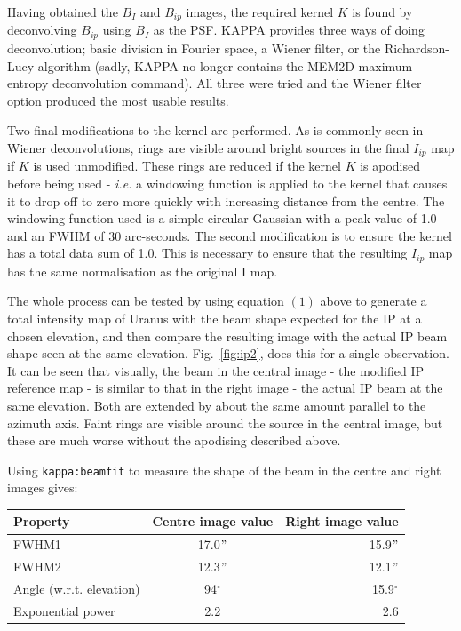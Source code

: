 \documentclass[twoside,11pt]{starlink}
\begin{document}
\begin{itemize}
Having obtained the $B_{I}$ and $B_{ip}$ images, the required kernel $K$
is found by deconvolving $B_{ip}$ using $B_{I}$ as the PSF. KAPPA provides
three ways of doing deconvolution; basic division in Fourier space, a
Wiener filter, or the Richardson-Lucy algorithm (sadly, KAPPA no longer
contains the MEM2D maximum entropy deconvolution command). All three were
tried and the Wiener filter option produced the most usable results.

Two final modifications to the kernel are performed. As is commonly seen
in Wiener deconvolutions, rings are visible around bright sources in the
final $I_{ip}$ map if $K$ is used unmodified. These rings are reduced if the
kernel $K$ is apodised before being used - \emph{i.e.} a windowing function is
applied to the kernel that causes it to drop off to zero more quickly
with increasing distance from the centre. The windowing function used is
a simple circular Gaussian with a peak value of 1.0 and an FWHM of 30
arc-seconds. The second modification is to ensure the kernel has a total
data sum of 1.0. This is necessary to ensure that the resulting $I_{ip}$ map
has the same normalisation as the original I map.

The whole process can be tested by using equation $(1)$ above to generate
a total intensity map of Uranus with the beam shape expected for the IP
at a chosen elevation, and then compare the resulting image with the
actual IP beam shape seen at the same elevation. Fig.~\ref{fig:ip2},
does this for a single observation. It can be seen that visually, the beam
in the central image - the modified IP reference map - is similar to that
in the right image - the actual IP beam at the same elevation. Both are
extended by about the same amount parallel to the azimuth axis. Faint
rings are visible around the source in the central image, but these
are much worse without the apodising described above.

Using \texttt{kappa:beamfit} to measure the shape of the beam in the
centre and right images gives:

\begin{tabular}{l|c|r}
  Property & Centre image value & Right image value \\
  \hline
  FWHM1 & 17.0$"$ & 15.9$"$ \\
  FWHM2 & 12.3$"$ & 12.1$"$ \\
  Angle (w.r.t. elevation) & 94$^{\circ}$ & 15.9$^{\circ}$ \\
  Exponential power & 2.2 & 2.6 \\
\end{tabular}


\end{itemize}
\end{document}
